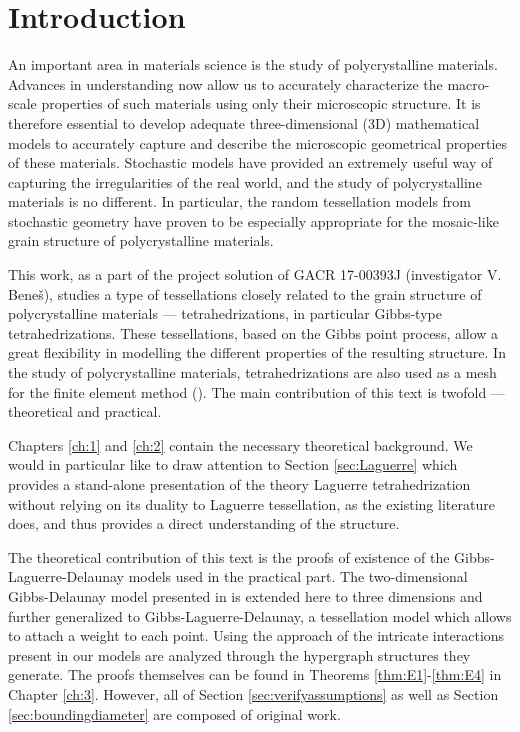 \chapter*{Introduction}

An important area in materials science is the study of polycrystalline materials. Advances in understanding now allow us to accurately characterize the macro-scale properties of such materials using only their microscopic structure. It is therefore essential to develop adequate three-dimensional (3D) mathematical models to accurately capture and describe the microscopic geometrical properties of these materials. 
Stochastic models have provided an extremely useful way of capturing the irregularities of the real world, and the study of polycrystalline materials is no different. In particular, the random tessellation models from stochastic geometry have proven to be especially appropriate for the mosaic-like grain structure of polycrystalline materials. 

This work, as a part of the project solution of GACR 17-00393J (investigator V. Bene\v{s}), studies a type of tessellations closely related to the grain structure of polycrystalline materials --- tetrahedrizations, in particular Gibbs-type tetrahedrizations. These tessellations, based on the Gibbs point process, allow a great flexibility in modelling the different properties of the resulting structure. In the study of polycrystalline materials, tetrahedrizations are also used as a mesh for the finite element method (\cite{Quey2011}).  
The main contribution of this text is twofold --- theoretical and practical. 

Chapters \ref{ch:1} and \ref{ch:2} contain the necessary theoretical background. We would in particular like to draw attention to Section \ref{sec:Laguerre} which provides a stand-alone presentation of the theory Laguerre tetrahedrization without relying on its duality to Laguerre tessellation, as the existing literature does, and thus provides a direct understanding of the structure.  

The theoretical contribution of this text is the proofs of existence of the Gibbs-Laguerre-Delaunay models used in the practical part. The two-dimensional Gibbs-Delaunay model presented in \cite{DDG12} is extended here to three dimensions and further generalized to Gibbs-Laguerre-Delaunay, a tessellation model which allows to attach a weight to each point. Using the approach of \cite{DDG12} the intricate interactions present in our models are analyzed through the hypergraph structures they generate. The proofs themselves can be found in Theorems \ref{thm:E1}-\ref{thm:E4} in Chapter \ref{ch:3}. However, all of Section \ref{sec:verifyassumptions} as well as Section \ref{sec:boundingdiameter} are composed of original work. 

